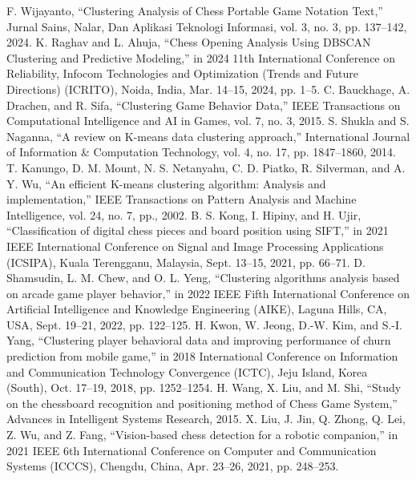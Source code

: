 \documentclass[conference]{IEEEtran}
\begin{document}

\begin{thebibliography}{00}
 F. Wijayanto, “Clustering Analysis of Chess Portable Game Notation Text,” Jurnal Sains, Nalar, Dan Aplikasi Teknologi Informasi, vol. 3, no. 3, pp. 137–142, 2024.
K. Raghav and L. Ahuja, “Chess Opening Analysis Using DBSCAN Clustering and Predictive Modeling,” in 2024 11th International Conference on Reliability, Infocom Technologies and Optimization (Trends and Future Directions) (ICRITO), Noida, India, Mar. 14–15, 2024, pp. 1–5.
 C. Bauckhage, A. Drachen, and R. Sifa, “Clustering Game Behavior Data,” IEEE Transactions on Computational Intelligence and AI in Games, vol. 7, no. 3, 2015.
 S. Shukla and S. Naganna, “A review on K-means data clustering approach,” International Journal of Information \& Computation Technology, vol. 4, no. 17, pp. 1847–1860, 2014.
 T. Kanungo, D. M. Mount, N. S. Netanyahu, C. D. Piatko, R. Silverman, and A. Y. Wu, “An efficient K-means clustering algorithm: Analysis and implementation,” IEEE Transactions on Pattern Analysis and Machine Intelligence, vol. 24, no. 7, pp., 2002.
 B. S. Kong, I. Hipiny, and H. Ujir, “Classification of digital chess pieces and board position using SIFT,” in 2021 IEEE International Conference on Signal and Image Processing Applications (ICSIPA), Kuala Terengganu, Malaysia, Sept. 13–15, 2021, pp. 66–71.
 D. Shamsudin, L. M. Chew, and O. L. Yeng, “Clustering algorithms analysis based on arcade game player behavior,” in 2022 IEEE Fifth International Conference on Artificial Intelligence and Knowledge Engineering (AIKE), Laguna Hills, CA, USA, Sept. 19–21, 2022, pp. 122–125.
 H. Kwon, W. Jeong, D.-W. Kim, and S.-I. Yang, “Clustering player behavioral data and improving performance of churn prediction from mobile game,” in 2018 International Conference on Information and Communication Technology Convergence (ICTC), Jeju Island, Korea (South), Oct. 17–19, 2018, pp. 1252–1254.
 H. Wang, X. Liu, and M. Shi, “Study on the chessboard recognition and positioning method of Chess Game System,” Advances in Intelligent Systems Research, 2015.
 X. Liu, J. Jin, Q. Zhong, Q. Lei, Z. Wu, and Z. Fang, “Vision-based chess detection for a robotic companion,” in 2021 IEEE 6th International Conference on Computer and Communication Systems (ICCCS), Chengdu, China, Apr. 23–26, 2021, pp. 248–253.
\end{thebibliography}
\end{document}
